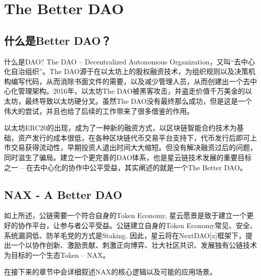 \section{The Better DAO}
\subsection{什么是Better DAO？}
什么是DAO? The DAO -- Decentralized Autonomous Organization，又叫“去中心化自治组织”。The DAO源于在以太坊上的股权融资技术，为组织规则以及决策机构编写代码，从而消除书面文件的需要，以及减少管理人员，从而创建出一个去中心化管理架构。2016年，以太坊The DAO被黑客攻击，并盗走价值千万美金的以太坊，最终导致以太坊硬分叉。虽然The DAO没有最终那么成功，但是这是一个伟大的尝试，并且也给了后续的工作带来了很多借鉴的作用。

以太坊ERC20的出现，成为了一种新的融资方式，以区块链智能合约技术为基础，资产发行的成本很低，在各种区块链代币交易平台支持下，代币发行后即可上市交易获得流动性，早期投资人退出时间大大缩短。但没有解决融资过后的问题，同时滋生了骗局。建立一个更完善的DAO体系，也是星云链技术发展的重要目标之一 -- 在去中心化的协作中公平受益，其实阐述的就是一个The Better DAO。

\subsection{NAX - A Better DAO}
如上所述，公链需要一个符合自身的Token Economy, 星云愿景是致于建立一个更好的协作平台，让参与者公平受益。公链建立自身的Token Economy常见、安全、系统漏洞低、防羊毛党的方式是Staking. 因此，星云将在NextDAO[x]框架下，提出一个以协作创新、激励贡献、刺激正向博弈、壮大社区共识、发展独有公链技术为目标的一个生态Token -- NAX。

在接下来的章节中会详细叙述NAX的核心逻辑以及可能的应用场景。
